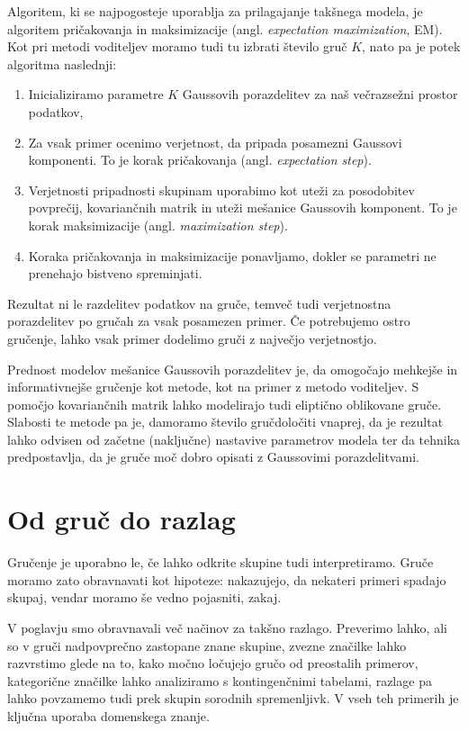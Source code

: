 Algoritem, ki se najpogosteje uporablja za prilagajanje takšnega modela, je
algoritem pričakovanja in maksimizacije (angl. {\em expectation maximization},
EM). Kot pri metodi voditeljev moramo tudi tu izbrati število gruč $K$, nato pa je potek algoritma naslednji:
\begin{enumerate}
\item Inicializiramo parametre $K$ Gaussovih porazdelitev za naš večrazsežni prostor podatkov,
\item Za vsak primer ocenimo verjetnost, da pripada posamezni Gaussovi komponenti. To je korak pričakovanja (angl. {\em expectation step}).
\item Verjetnosti pripadnosti skupinam uporabimo kot uteži za posodobitev povprečij, kovariančnih matrik in uteži mešanice Gaussovih komponent. To je korak maksimizacije (angl. {\em maximization step}).
\item Koraka pričakovanja in maksimizacije ponavljamo, dokler se parametri ne prenehajo bistveno spreminjati.
\end{enumerate}

Rezultat ni le razdelitev podatkov na gruče, temveč tudi verjetnostna porazdelitev po gručah za vsak posamezen primer. Če potrebujemo ostro gručenje, lahko vsak primer dodelimo gruči z največjo verjetnostjo.

Prednost modelov mešanice Gaussovih porazdelitev je, da omogočajo mehkejše in informativnejše gručenje kot metode, kot na primer z metodo voditeljev. S pomočjo kovariančnih matrik lahko modelirajo tudi eliptično oblikovane gruče. Slabosti te metode pa je, damoramo število gručdoločiti vnaprej,
da je rezultat lahko odvisen od začetne (naključne) nastavive parametrov modela ter da tehnika predpostavlja, da je gruče moč dobro opisati z Gaussovimi porazdelitvami.

\section{Od gruč do razlag}

Gručenje je uporabno le, če lahko odkrite skupine tudi interpretiramo. Gruče moramo zato obravnavati kot hipoteze: nakazujejo, da nekateri primeri spadajo skupaj, vendar moramo še vedno pojasniti, zakaj.

V poglavju smo obravnavali več načinov za takšno razlago. Preverimo lahko, ali so v gruči nadpovprečno zastopane znane skupine, zvezne značilke lahko razvrstimo glede na to, kako močno ločujejo gručo od preostalih primerov, kategorične značilke lahko analiziramo s kontingenčnimi tabelami, razlage pa lahko povzamemo tudi prek skupin sorodnih spremenljivk. V vseh teh primerih je ključna uporaba domenskega znanje.

